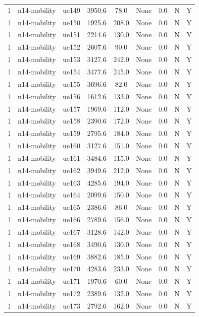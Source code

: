 \begin{table}[ht]
\begin{tabular}{|c|c|c|c|c|c|c|c|c|}
1 & n14-mobility & ue149 & 3950.6 & 78.0 & None & 0.0 & N & Y \\
1 & n14-mobility & ue150 & 1925.6 & 208.0 & None & 0.0 & N & Y \\
1 & n14-mobility & ue151 & 2214.6 & 130.0 & None & 0.0 & N & Y \\
1 & n14-mobility & ue152 & 2607.6 & 90.0 & None & 0.0 & N & Y \\
1 & n14-mobility & ue153 & 3127.6 & 242.0 & None & 0.0 & N & Y \\
1 & n14-mobility & ue154 & 3477.6 & 245.0 & None & 0.0 & N & Y \\
1 & n14-mobility & ue155 & 3696.6 & 82.0 & None & 0.0 & N & Y \\
1 & n14-mobility & ue156 & 1612.6 & 133.0 & None & 0.0 & N & Y \\
1 & n14-mobility & ue157 & 1969.6 & 112.0 & None & 0.0 & N & Y \\
1 & n14-mobility & ue158 & 2390.6 & 172.0 & None & 0.0 & N & Y \\
1 & n14-mobility & ue159 & 2795.6 & 184.0 & None & 0.0 & N & Y \\
1 & n14-mobility & ue160 & 3127.6 & 151.0 & None & 0.0 & N & Y \\
1 & n14-mobility & ue161 & 3484.6 & 115.0 & None & 0.0 & N & Y \\
1 & n14-mobility & ue162 & 3949.6 & 212.0 & None & 0.0 & N & Y \\
1 & n14-mobility & ue163 & 4285.6 & 194.0 & None & 0.0 & N & Y \\
1 & n14-mobility & ue164 & 2099.6 & 150.0 & None & 0.0 & N & Y \\
1 & n14-mobility & ue165 & 2386.6 & 86.0 & None & 0.0 & N & Y \\
1 & n14-mobility & ue166 & 2789.6 & 156.0 & None & 0.0 & N & Y \\
1 & n14-mobility & ue167 & 3128.6 & 142.0 & None & 0.0 & N & Y \\
1 & n14-mobility & ue168 & 3490.6 & 130.0 & None & 0.0 & N & Y \\
1 & n14-mobility & ue169 & 3882.6 & 185.0 & None & 0.0 & N & Y \\
1 & n14-mobility & ue170 & 4283.6 & 233.0 & None & 0.0 & N & Y \\
1 & n14-mobility & ue171 & 1970.6 & 60.0 & None & 0.0 & N & Y \\
1 & n14-mobility & ue172 & 2389.6 & 132.0 & None & 0.0 & N & Y \\
1 & n14-mobility & ue173 & 2792.6 & 162.0 & None & 0.0 & N & Y \\

\end{tabular}
\end{table}
